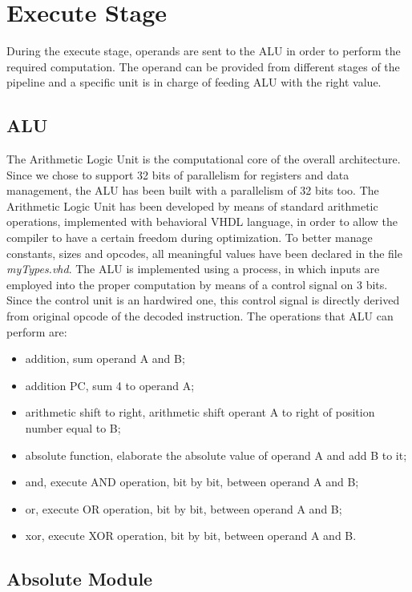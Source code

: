 \section{Execute Stage}

During the execute stage, operands are sent to the ALU in order to perform the required computation. 
The operand can be provided from different stages of the pipeline and a specific unit is in charge of feeding ALU with the right value.

\subsection{ALU}

The Arithmetic Logic Unit is the computational core of the overall architecture.
Since we chose to support 32 bits of parallelism for registers and data management, the ALU has been built with a parallelism of 32 bits too.
The Arithmetic Logic Unit has been developed by means of standard arithmetic operations, implemented with behavioral VHDL language, in order to allow the compiler 
to have a certain freedom during optimization.
To better manage constants, sizes and opcodes, all meaningful values have been declared in the file \textit{myTypes.vhd}.
The ALU is implemented using a process, in which inputs are employed into the proper computation by means of a control signal on 3 bits.
Since the control unit is an hardwired one, this control signal is directly derived from original opcode of the decoded instruction.
The operations that ALU can perform are:
\begin{itemize}
    \item addition, sum operand A and B;
    \item addition PC, sum 4 to operand A;
    \item arithmetic shift to right, arithmetic shift operant A to right of position number equal to B;
    \item absolute function, elaborate the absolute value of operand A and add B to it;
    \item and, execute AND operation, bit by bit, between operand A and B;
    \item or, execute OR operation, bit by bit, between operand A and B;
    \item xor, execute XOR operation, bit by bit, between operand A and B.
\end{itemize}
    

\subsection{Absolute Module}

